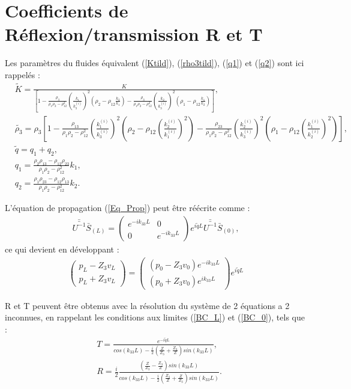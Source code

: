 \documentclass[12pt]{report}
\begin{document}
\section{Coefficients de Réflexion/transmission R et T}
\label{Ch_Dir_S_R/T}
    Les paramètres du fluides équivalent (\ref{Ktild}), (\ref{rho3tild}), (\ref{q1}) et (\ref{q2}) sont ici rappelés :
    \begin{align*}
    &\tilde{K}=\frac{K}{[1-\frac{\rho_3}{\rho_1\rho_2-\rho_{12}^2}(\frac{k_1}{k_3^{(i)}})^2(\rho_2-\rho_{12}\frac{k_2}{k_1})-\frac{\rho_3}{\rho_1\rho_2-\rho_{12}^2}(\frac{k_2}{k_3^{(i)}})^2(\rho_1-\rho_{12}\frac{k_1}{k_2})]},\\
    &\tilde{\rho_3}=\rho_3[1-\frac{\rho_{13}}{\rho_1\rho_2-\rho_{12}^2}(\frac{k_1^{(i)}}{k_3^{(i)}})^2(\rho_2-\rho_{12}(\frac{k_2^{(i)}}{k_1^{(i)}})^2)-\frac{\rho_{23}}{\rho_{1}\rho_2-\rho_{12}^2}(\frac{k_2^{(i)}}{k_3^{(i)}})^2(\rho_1-\rho_{12}(\frac{k_1^{(i)}}{k_2^{(i)}})^2)], \\
    &\tilde{q}=q_1+q_2,\\
    &q_{1}=\frac{\rho_2\rho_{13}-\rho_{12}\rho_{23}}{\rho_1\rho_2-\rho_{12}^2}k_1,\\
    &q_{2}= \frac{\rho_1\rho_{23}-\rho_{12}\rho_{13}}{\rho_1\rho_2-\rho_{12}^2}k_2.
    \end{align*}
    
    L'équation de propagation (\ref{Eq_Prop}) peut être réécrite comme :
    \begin{align}
         \bar{\bar{U^{-1}}}\bar{S}_{(L)}=\begin{pmatrix}
                        e^{-ik_{33}L} & 0 \\ 0 & e^{-ik_{33}L} 
                      \end{pmatrix} e^{i\tilde{q}L}\bar{\bar{U^{-1}}}\bar{S}_{(0)},
    \end{align}
    ce qui devient en développant :
    \begin{align}
    \begin{pmatrix}
		p_L-Z_3v_L \\ p_L+Z_3v_L
    \end{pmatrix}=\begin{pmatrix}
              		(p_0-Z_3v_0)e^{-i k_{33} L} \\ (p_0+Z_3v_0)e^{i k_{33} L}
            \end{pmatrix} e^{i \tilde{q} L}\label{eqDif_tmp}
    \end{align}  
    
    R et T peuvent être obtenus avec la résolution du système de 2 équations a 2 inconnues, en rappelant les conditions aux limites (\ref{BC_L}) et (\ref{BC_0}), tels que :
    \begin{align}
    &T=\frac{e^{-i\tilde{q}L}}{cos(k_{33}L)-\frac{i}{2}(\frac{Z}{Z_3}+\frac{Z_3}{Z})sin(k_{33}L)}\label{Transmission},\\ 
    &R=\frac{i}{2} \frac{(\frac{Z}{Z_3}-\frac{Z_3}{Z})sin(k_{33}L)}{cos(k_{33}L)-\frac{i}{2}(\frac{Z_3}{Z}+\frac{Z}{Z_3})sin(k_{33}L)}\label{Reflexion}.
    \end{align}
    
\end{document}
